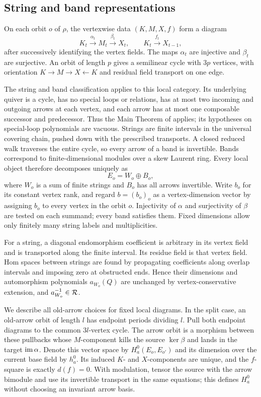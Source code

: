 \subsection{String and band representations}
On each orbit $o$ of $\rho$, the vertexwise data $(K,M,X,f)$ form a diagram
\begin{equation}\label{eq:local}
 K_t\xrightarrow{\alpha_t}M_t\xrightarrow{\beta_t}X_t,
 \qquad K_t\xrightarrow{f_t}X_{t-1},
\end{equation}
after successively identifying the vertex fields. The maps $\alpha_t$ are injective and $\beta_t$ are surjective. An orbit of length $p$ gives a semilinear cycle with $3p$ vertices, with orientation $K\to M\to X\leftarrow K$ and residual field transport on one edge.

The string and band classification applies to this local category. Its underlying quiver is a cycle, has no special loops or relations, has at most two incoming and outgoing arrows at each vertex, and each arrow has at most one composable successor and predecessor. Thus the Main Theorem of \cite{BTCB} applies; its hypotheses on special-loop polynomials are vacuous. Strings are finite intervals in the universal covering chain, pushed down with the prescribed transports. A closed reduced walk traverses the entire cycle, so every arrow of a band is invertible. Bands correspond to finite-dimensional modules over a skew Laurent ring. Every local object therefore decomposes uniquely as
\[
 E_o=W_o\oplus B_o,
\]
where $W_o$ is a sum of finite strings and $B_o$ has all arrows invertible. Write $b_o$ for its constant vertex rank, and regard $b=(b_o)_o$ as a vertex-dimension vector by assigning $b_o$ to every vertex in the orbit $o$. Injectivity of $\alpha$ and surjectivity of $\beta$ are tested on each summand; every band satisfies them. Fixed dimensions allow only finitely many string labels and multiplicities.

For a string, a diagonal endomorphism coefficient is arbitrary in its vertex field and is transported along the finite interval. Its residue field is that vertex field. Hom spaces between strings are found by propagating coefficients along overlap intervals and imposing zero at obstructed ends. Hence their dimensions and automorphism polynomials $a_{W_o}(Q)$ are unchanged by vertex-conservative extension, and $a_{W_o}^{-1}\in\mathcal R$.

We describe all old-arrow choices for fixed local diagrams. In the split case, an old-arrow orbit of length $l$ has endpoint periods dividing $l$. Pull both endpoint diagrams to the common $3l$-vertex cycle. The arrow orbit is a morphism between these pullbacks whose $M$-component kills the source $\ker\beta$ and lands in the target $\operatorname{im}\alpha$. Denote this vector space by $H_a^0(E_o,E_{o'})$ and its dimension over the current base field by $h_a^0$. Its induced $K$- and $X$-components are unique, and the $f$-square is exactly $d(f)=0$. With modulation, tensor the source with the arrow bimodule and use its invertible transport in the same equations; this defines $H_a^0$ without choosing an invariant arrow basis.

